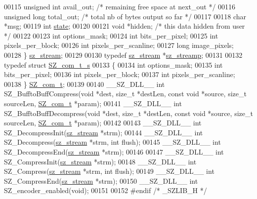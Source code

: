 \begin{DoxyCode}
00115     \textcolor{keywordtype}{unsigned} \textcolor{keywordtype}{int}    avail\_out; \textcolor{comment}{/* remaining free space at next\_out */}
00116     \textcolor{keywordtype}{unsigned} \textcolor{keywordtype}{long}    total\_out; \textcolor{comment}{/* total nb of bytes output so far */}
00117 
00118     \textcolor{keywordtype}{char}            *msg;
00119     \textcolor{keywordtype}{int}                \hyperlink{structstate}{state};
00120 
00121     \textcolor{keywordtype}{void}            *hidden;    \textcolor{comment}{/* this data hidden from user */}
00122 
00123     \textcolor{keywordtype}{int}        options\_mask;
00124     \textcolor{keywordtype}{int}        bits\_per\_pixel;
00125     \textcolor{keywordtype}{int}        pixels\_per\_block;
00126     \textcolor{keywordtype}{int}        pixels\_per\_scanline;
00127     \textcolor{keywordtype}{long}    image\_pixels;
00128     \} \hyperlink{structsz__stream__s}{sz\_stream};
00129 
00130 \textcolor{keyword}{typedef} \hyperlink{structsz__stream__s}{sz\_stream} *\hyperlink{structsz__stream__s}{sz\_streamp};
00131 
00132 \textcolor{keyword}{typedef} \textcolor{keyword}{struct }\hyperlink{struct_s_z__com__t__s}{SZ\_com\_t\_s}
00133     \{
00134     \textcolor{keywordtype}{int} options\_mask;
00135     \textcolor{keywordtype}{int} bits\_per\_pixel;
00136     \textcolor{keywordtype}{int} pixels\_per\_block;
00137     \textcolor{keywordtype}{int} pixels\_per\_scanline;
00138     \} \hyperlink{struct_s_z__com__t__s}{SZ\_com\_t};
00139 
00140 \_\_SZ\_DLL\_\_ \textcolor{keywordtype}{int} SZ\_BufftoBuffCompress(\textcolor{keywordtype}{void} *dest, \textcolor{keywordtype}{size\_t} *destLen, \textcolor{keyword}{const} \textcolor{keywordtype}{void} *source, \textcolor{keywordtype}{size\_t} sourceLen, 
      \hyperlink{struct_s_z__com__t__s}{SZ\_com\_t} *param);
00141 \_\_SZ\_DLL\_\_ \textcolor{keywordtype}{int} SZ\_BufftoBuffDecompress(\textcolor{keywordtype}{void} *dest, \textcolor{keywordtype}{size\_t} *destLen, \textcolor{keyword}{const} \textcolor{keywordtype}{void} *source, \textcolor{keywordtype}{size\_t} sourceLen, 
      \hyperlink{struct_s_z__com__t__s}{SZ\_com\_t} *param);
00142 
00143 \_\_SZ\_DLL\_\_ \textcolor{keywordtype}{int} SZ\_DecompressInit(\hyperlink{structsz__stream__s}{sz\_stream} *strm);
00144 \_\_SZ\_DLL\_\_ \textcolor{keywordtype}{int} SZ\_Decompress(\hyperlink{structsz__stream__s}{sz\_stream} *strm, \textcolor{keywordtype}{int} flush);
00145 \_\_SZ\_DLL\_\_ \textcolor{keywordtype}{int} SZ\_DecompressEnd(\hyperlink{structsz__stream__s}{sz\_stream} *strm);
00146 
00147 \_\_SZ\_DLL\_\_ \textcolor{keywordtype}{int} SZ\_CompressInit(\hyperlink{structsz__stream__s}{sz\_stream} *strm);
00148 \_\_SZ\_DLL\_\_ \textcolor{keywordtype}{int} SZ\_Compress(\hyperlink{structsz__stream__s}{sz\_stream} *strm, \textcolor{keywordtype}{int} flush);
00149 \_\_SZ\_DLL\_\_ \textcolor{keywordtype}{int} SZ\_CompressEnd(\hyperlink{structsz__stream__s}{sz\_stream} *strm);
00150 \_\_SZ\_DLL\_\_ \textcolor{keywordtype}{int} SZ\_encoder\_enabled(\textcolor{keywordtype}{void});
00151 
00152 \textcolor{preprocessor}{#endif }\textcolor{comment}{/* \_SZLIB\_H */}\textcolor{preprocessor}{}
\end{DoxyCode}
